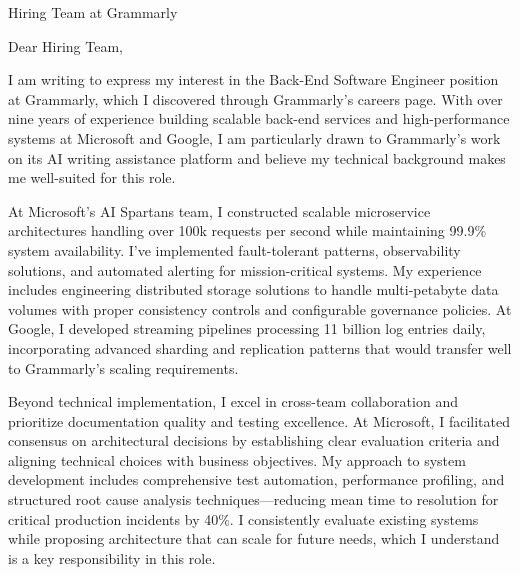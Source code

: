 
\newcommand{\COMPANY}{Grammarly}
\newcommand{\POSITION}{Back-End Software Engineer}
\newcommand{\SOURCE}{Grammarly's careers page}
\newcommand{\PRODUCT}{AI writing assistance platform}
\newcommand{\SPECIFICREASON}{opportunity to build scalable systems that improve communication for millions}
\newcommand{\RELEVANTTECHNOLOGY}{natural language processing and machine learning infrastructure}
\newcommand{\TEAMNAME}{engineering team}

\noindent Hiring Team at \COMPANY
\vspace{0.4cm}

\noindent Dear Hiring Team,
\vspace{0.4cm}

I am writing to express my interest in the \POSITION{} position at \COMPANY, which I discovered through \SOURCE. With over nine years of experience building scalable back-end services and high-performance systems at Microsoft and Google, I am particularly drawn to \COMPANY's work on its \PRODUCT{} and believe my technical background makes me well-suited for this role.
\vspace{0.2cm}

At Microsoft's AI Spartans team, I constructed scalable microservice architectures handling over 100k requests per second while maintaining 99.9\% system availability. I've implemented fault-tolerant patterns, observability solutions, and automated alerting for mission-critical systems. My experience includes engineering distributed storage solutions to handle multi-petabyte data volumes with proper consistency controls and configurable governance policies. At Google, I developed streaming pipelines processing 11 billion log entries daily, incorporating advanced sharding and replication patterns that would transfer well to \COMPANY's scaling requirements.
\vspace{0.2cm}

Beyond technical implementation, I excel in cross-team collaboration and prioritize documentation quality and testing excellence. At Microsoft, I facilitated consensus on architectural decisions by establishing clear evaluation criteria and aligning technical choices with business objectives. My approach to system development includes comprehensive test automation, performance profiling, and structured root cause analysis techniques—reducing mean time to resolution for critical production incidents by 40\%. I consistently evaluate existing systems while proposing architecture that can scale for future needs, which I understand is a key responsibility in this role.
\vspace{0.2cm}

